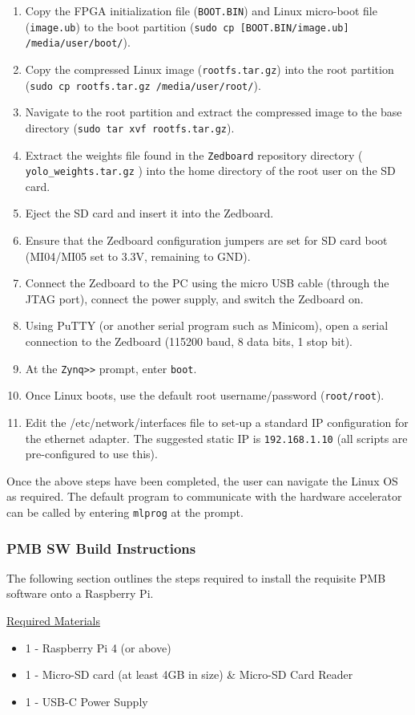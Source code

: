 \documentclass[10pt,letterpaper]{article}
\begin{document}
\begin{enumerate}
\item Copy the FPGA initialization file (\texttt{BOOT.BIN}) and Linux micro-boot file (\texttt{image.ub}) to the boot partition (\texttt{sudo cp [BOOT.BIN/image.ub] /media/user/boot/}).
\item Copy the compressed Linux image (\texttt{rootfs.tar.gz}) into the root partition (\texttt{sudo cp rootfs.tar.gz /media/user/root/}). 
\item Navigate to the root partition and extract the compressed image to the base directory (\texttt{sudo tar xvf rootfs.tar.gz}).
\item Extract the weights file found in the \texttt{Zedboard\/} repository directory ( \texttt{yolo\_weights.tar.gz} ) into the home directory of the root user on the SD card.
\item Eject the SD card and insert it into the Zedboard.
\item Ensure that the Zedboard configuration jumpers are set for SD card boot (MI04/MI05 set to 3.3V, remaining to GND).
\item Connect the Zedboard to the PC using the micro USB cable (through the JTAG port), connect the power supply, and switch the Zedboard on.
\item Using PuTTY (or another serial program such as Minicom), open a serial connection to the Zedboard (115200 baud, 8 data bits, 1 stop bit).
\item At the \texttt{Zynq>>} prompt, enter \texttt{boot}.
\item Once Linux boots, use the default root username/password (\texttt{root/root}).
\item Edit the /etc/network/interfaces file to set-up a standard IP configuration for the ethernet adapter. The suggested static IP is \texttt{192.168.1.10} (all scripts are pre-configured to use this).
\end{enumerate}

Once the above steps have been completed, the user can navigate the Linux OS as required. The default program to communicate with the hardware accelerator can be called by entering \texttt{mlprog} at the prompt.

\subsubsection{PMB SW Build Instructions}
The following section outlines the steps required to install the requisite PMB software onto a Raspberry Pi.

\underline{Required Materials}
\begin{itemize}
\item 1 - Raspberry Pi 4 (or above)
\item 1 - Micro-SD card (at least 4GB in size) \& Micro-SD Card Reader
\item 1 - USB-C Power Supply
\end{itemize}
\end{document}
